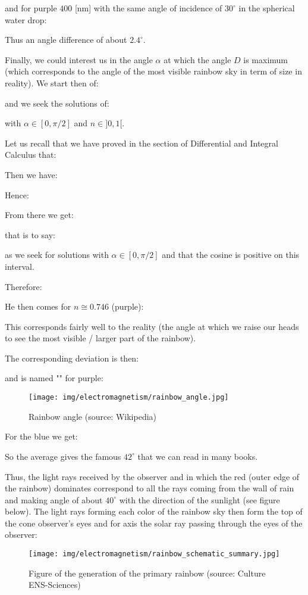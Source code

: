 	and for purple $400$ [nm] with the same angle of incidence of $30^\circ$ in the spherical water drop:
	
	Thus an angle difference of about $2.4^\circ$.
	
	Finally, we could interest us in the angle $\alpha$ at which the angle $D$ is maximum (which corresponds to the angle of the most visible rainbow sky in term of size in reality). We start then of:
	
	and we seek the solutions of:
	
	with $\alpha\in[0,\pi/2]$ and $n\in]0,1[.$

	Let us recall that we have proved in the section of Differential and Integral Calculus that:
	
	Then we have:
	
	Hence:
	
	From there we get:
	
	that is to say:
	
	as we seek for solutions with $\alpha\in[0,\pi/2]$ and that the cosine is positive on this interval.

	Therefore:
	
	He then comes for $n\cong0.746$ (purple):
	
	This corresponds fairly well to the reality (the angle at which we raise our heads to see the most visible / larger part of the rainbow).
	
	The corresponding deviation is then:
	
	and is named "" for purple:
	\begin{figure}[H]
		\centering
		\texttt{[image: img/electromagnetism/rainbow\_angle.jpg]}
		\caption[]{Rainbow angle (source: Wikipedia)}
	\end{figure}
	For the blue we get:
	
	So the average gives the famous $42^\circ$ that we can read in many books.
	
	Thus, the light rays received by the observer and in which the red (outer edge of the rainbow) dominates correspond to all the rays coming from the wall of rain and making angle of about $40^\circ$ with the direction of the sunlight (see figure below). The light rays forming each color of the rainbow sky then form the top of the cone observer's eyes and for axis the solar ray passing through the eyes of the observer:
	\begin{figure}[H]
		\centering
		\texttt{[image: img/electromagnetism/rainbow\_schematic\_summary.jpg]}
		\caption[]{Figure of the generation of the primary rainbow (source: Culture ENS-Sciences)}
	\end{figure}
	
